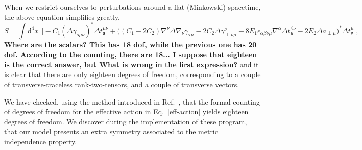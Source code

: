 \documentclass[aps,prd,12pt,twocolumn,superscriptaddress,showpacs,showkeys,reprint%
]{revtex4-1}
\renewcommand{\(}{\left(}
\renewcommand{\)}{\right)}
\renewcommand{\[}{\left[}
\renewcommand{\]}{\right]}
\newcommand{\dn}[2]{{\mathrm{d}}^{#1}{#2}\;}
\newcommand{\hl}[1]{{\color{red} \bfseries{#1}}}
\begin{document}
When we restrict ourselves to perturbations around a flat (Minkowski) spacetime, the above equation simplifies greatly,
\begin{dmath}
  S = \int \dn{4}{x} \, \bigg[
    - C_1 ( \Delta\gamma_{\texttt{s}\mu\nu})^* \Delta t_{\texttt{s}}^{\mu\nu}
    + \Big( ( C_1 - 2 C_2) \nabla^\nu \Delta \nabla_\nu \gamma_{\texttt{v}\mu}
    - 2 C_2 \Delta \gamma^\nu_{\perp\nu\mu}
    - 8 E_1 \epsilon_{\alpha\beta\nu\mu} \nabla^{\alpha} \Delta t_{\texttt{a}}^{\beta\nu}
    - 2 E_2 \Delta a_{\perp\mu} \Big)^* \Delta t_{\texttt{v}}^\mu
    \bigg],
\end{dmath}
\hl{Where are the scalars? This has 18 dof, while the previous one has 20 dof. According to the counting, there are 18... I suppose that eighteen is the correct answer, but What is wrong in the first expression?} and it is clear that there are only eighteen degrees of freedom, corresponding to a couple of transverse-traceless rank-two-tensors, and a couple of transverse vectors.

We have checked, using the method introduced in Ref.~\cite{Diaz:2014yua}, that the formal counting of degrees of freedom for the effective action in Eq.~\eqref{eff-action} yields eighteen degrees of freedom. We discover during the implementation of these program, that our model presents an extra symmetry associated to the metric independence property. 
\end{document}
